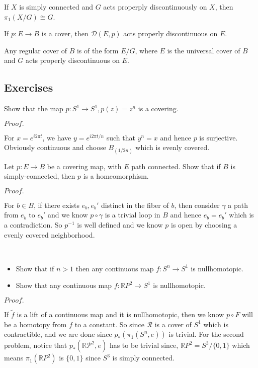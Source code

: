 \documentclass{article}
\newcommand{\Pf}[1]{$Proof.$\par}
\begin{document}
\begin{corollary}
    If $X$ is simply connected and $G$ acts properply discontinuously on $X$, then $\pi_1(X/G)\cong G$.
\end{corollary}

\begin{proposition}
    If $p:E\to B$ is a cover, then $\mathcal{D}(E,p)$ acts properly discontinuous on $E$.
\end{proposition}

\begin{proposition}
    Any regular cover of $B$ is of the form $E/G$, where $E$ is the universal cover of $B$ and $G$ acts properly discontinuous on $E$.
\end{proposition}

\subsection{Exercises}

\begin{exercise}
    Show that the map $p:S^1 \to S^1, p(z) = z^n$ is a covering.
\end{exercise}
\Pf\par
    For $x = e^{i2\pi t}$, we have $y = e^{i2\pi t/n}$ such that $y^n = x$ and hence $p$ is surjective. Obviously continuous and choose $B_(1/2n)$ which is evenly covered.

\begin{exercise}
    Let $p:E\to B$ be a covering map, with $E$ path connected. Show that if $B$ is simply-connected, then $p$ is a homeomorphism.
\end{exercise}
\Pf\par
    For $b\in B$, if there exists $e_b, e_b'$ distinct in the fiber of $b$, then consider $\gamma$ a path from $e_b$ to $e_b'$ and we know $p\circ \gamma$ is a trivial loop in $B$ and hence $e_b = e_b'$ which is a contradiction. So $p^{-1}$ is well defined and we know $p$ is open by choosing a evenly covered neighborhood.

\begin{exercise}\ \par
    \begin{itemize}
        \item Show that if $n>1$ then any continuous map $f:S^n \to S^1$ is nullhomotopic.
        \item Show that any continuous map $f:\mathbb{R}P^2 \to S^1$ is nullhomotopic.
    \end{itemize}
\end{exercise}
\Pf\par
    If $\widetilde{f}$ is a lift of a continuous map and it is nullhomotopic, then we know $p\circ F$ will be a homotopy from $f$ to a constant. So since $\mathcal{R}$ is a cover of $S^1$ which is contractible, and we are done since $p_*(\pi_1(S^n, e))$ is trivial.
    For the second problem, notice that $p_*(\mathcal{\mathbb{R}P^2}, e)$ has to be trivial since, $\mathbb{R}P^2 = S^3/\{0,1\}$ which means $\pi_1(\mathbb{R}P^2)$ is $\{0,1\}$ since $S^3$ is simply connected.
\end{document}
